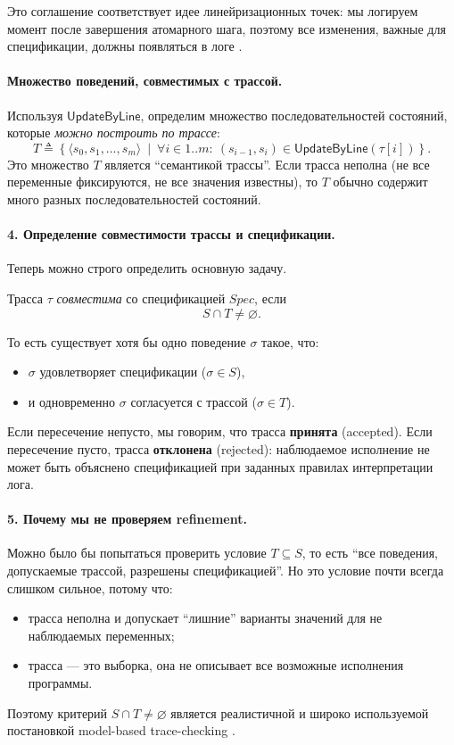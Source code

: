 Это соглашение соответствует идее линейризационных точек:
мы логируем момент после завершения атомарного шага, поэтому все изменения,
важные для спецификации, должны появляться в логе \cite{CirsteaKuppeLoillierMerz2024}.

\paragraph{Множество поведений, совместимых с трассой.}
Используя $\mathsf{UpdateByLine}$, определим множество последовательностей состояний,
которые \emph{можно построить по трассе}:
\[
T \triangleq \left\{
\langle s_0, s_1, \dots, s_m \rangle \ \middle|\
\forall i \in 1..m:\ (s_{i-1}, s_i) \in \mathsf{UpdateByLine}(\tau[i])
\right\}.
\]
Это множество $T$ является ``семантикой трассы''.
Если трасса неполна (не все переменные фиксируются, не все значения известны),
то $T$ обычно содержит много разных последовательностей состояний.

\paragraph{4. Определение совместимости трассы и спецификации.}
Теперь можно строго определить основную задачу.

\begin{definition}
Трасса $\tau$ \emph{совместима} со спецификацией $\mathit{Spec}$, если
\[
S \cap T \neq \varnothing.
\]
\end{definition}

То есть существует хотя бы одно поведение $\sigma$ такое, что:
\begin{itemize}
    \item $\sigma$ удовлетворяет спецификации ($\sigma \in S$),
    \item и одновременно $\sigma$ согласуется с трассой ($\sigma \in T$).
\end{itemize}

Если пересечение непусто, мы говорим, что трасса \textbf{принята} (accepted).
Если пересечение пусто, трасса \textbf{отклонена} (rejected): наблюдаемое исполнение
не может быть объяснено спецификацией при заданных правилах интерпретации лога.

\paragraph{5. Почему мы не проверяем refinement.}
Можно было бы попытаться проверить условие $T \subseteq S$,
то есть ``все поведения, допускаемые трассой, разрешены спецификацией''.
Но это условие почти всегда слишком сильное, потому что:
\begin{itemize}
    \item трасса неполна и допускает ``лишние'' варианты значений для не наблюдаемых
    переменных;
    \item трасса — это выборка, она не описывает все возможные исполнения программы.
\end{itemize}
Поэтому критерий $S \cap T \neq \varnothing$ является реалистичной и широко
используемой постановкой model-based trace-checking \cite{HowardTraceChecking2011}.


